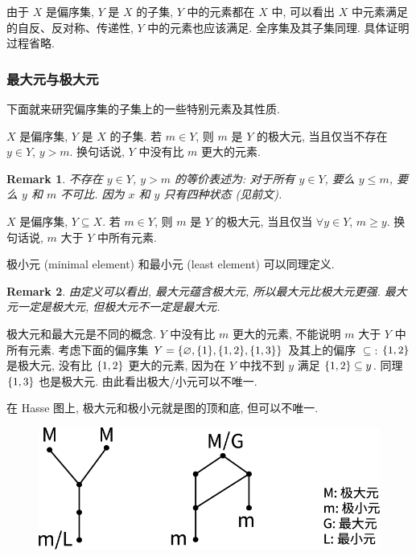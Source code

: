 \documentclass[UTF8]{ctexart}
\theoremstyle{mystyle}
\theoremstyle{myremark}
\newtheorem*{remark}{Remark}
\theoremstyle{plain}
\DeclarePairedDelimiter\set{\{}{\}}
\begin{document}
由于 $ X $ 是偏序集, $ Y $ 是 $ X $ 的子集, $ Y $ 中的元素都在 $ X $ 中, 可以看出 $ X $ 中元素满足的自反、反对称、传递性, $ Y $ 中的元素也应该满足. 全序集及其子集同理. 具体证明过程省略.

\subsubsection{最大元与极大元}
下面就来研究偏序集的子集上的一些特别元素及其性质.

\begin{definition}
    $ X $ 是偏序集, $ Y $ 是 $ X $ 的子集. 若 $ m \in Y $, 则 $ m $ 是 $ Y $ 的极大元, 当且仅当不存在 $ y \in Y $, $ y > m $. 换句话说, $ Y $ 中没有比 $ m $ 更大的元素. 
\end{definition}

\begin{remark}
    不存在 $ y \in Y $, $ y > m $ 的等价表述为: 对于所有 $ y \in Y $, 要么 $ y \le m $, 要么 $ y $ 和 $ m $ 不可比. 因为 $ x $ 和 $ y $ 只有四种状态 (见前文).
\end{remark}

\begin{definition}
    $ X $ 是偏序集, $ Y \subseteq X $. 若 $ m \in Y $, 则 $ m $ 是 $ Y $ 的极大元, 当且仅当 $ \forall y \in Y $, $ m \ge y $. 换句话说, $ m $ 大于 $ Y $ 中所有元素.
\end{definition}

极小元 (minimal element) 和最小元 (least element) 可以同理定义.

\begin{remark}
    由定义可以看出, 最大元蕴含极大元, 所以最大元比极大元更强. 最大元一定是极大元, 但极大元不一定是最大元.
\end{remark}


极大元和最大元是不同的概念. $ Y $ 中没有比 $ m $ 更大的元素, 不能说明 $ m $ 大于 $ Y $ 中所有元素. 考虑下面的偏序集 $ Y = \set{\varnothing, \set{1}, \set{1, 2}, \set{1, 3}} $ 及其上的偏序 $ \subseteq $: $ \set{1, 2} $ 是极大元, 没有比 $ \set{1, 2} $ 更大的元素, 因为在 $ Y $ 中找不到 $ y $ 满足 $ \set{1, 2} \subseteq y $. 同理 $ \set{1, 3} $ 也是极大元. 由此看出极大/小元可以不唯一.

在 Hasse 图上, 极大元和极小元就是图的顶和底, 但可以不唯一. 

\begin{figure}[H]
    \centering
    \includegraphics[width = 0.6\linewidth]{./images/maximal_greatest.png}
\end{figure} 
\end{document}
